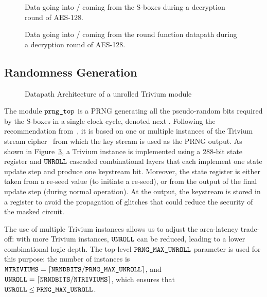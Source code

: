 \documentclass{scrartcl}
\begin{document}
\begin{figure}
    \centering
    
    \caption{Data going into / coming from the S-boxes during a decryption round of AES-128.}
    \label{fig:pipe_sbox_decryption}
\end{figure}

\begin{figure}
    \centering
    
    \caption{Data going into / coming from the round function datapath during a decryption round of AES-128.}
    \label{fig:pipe_dpstate_decryption}
\end{figure}


\subsection{Randomness Generation} 


\begin{figure}
    \centering
    \resizebox{\textwidth}{!}{
        \begin{tikzpicture}
            
        \end{tikzpicture}
    }
    \caption{Datapath Architecture of a unrolled Trivium module}
    \label{fig:prng}
\end{figure}


\label{subsection:PRNG}

The module $\texttt{prng\_top}$ is a PRNG generating all the pseudo-random bits
required by the S-boxes in a single clock cycle, denoted next \NRNDBITS.
Following the recommendation from~\cite{CiC-1-2-4}, it is based on one or
multiple instances of the Trivium stream
cipher~\cite{DBLP:series/lncs/CanniereP08} from which the key stream is used as
the PRNG output. As shown in Figure~\ref{fig:prng}, a Trivium instance is
implemented using a 288-bit state register and $\texttt{UNROLL}$ cascaded combinational
layers that each implement one state update step and produce one keystream bit.
Moreover, the state register is either taken from a re-seed value (to initiate a
re-seed), or from the output of the final update step (during normal operation).
At the output, the keystream is stored in a register to avoid the propagation
of glitches that could reduce the security of the masked circuit.

The use of multiple Trivium instances allows us to adjust the area-latency
trade-off: with more Trivium instances, $\texttt{UNROLL}$ can be reduced, leading to a
lower combinational logic depth.  The top-level $\texttt{PRNG\_MAX\_UNROLL}$ parameter is used
for this purpose: the number of instances is $\texttt{NTRIVIUMS} = \lceil \texttt{NRNDBITS} /
\texttt{PRNG\_MAX\_UNROLL} \rceil$, and $\texttt{UNROLL} = \lceil \texttt{NRNDBITS} / \texttt{NTRIVIUMS} \rceil$, which
ensures that $\texttt{UNROLL} \le \texttt{PRNG\_MAX\_UNROLL}$.
\end{document}
